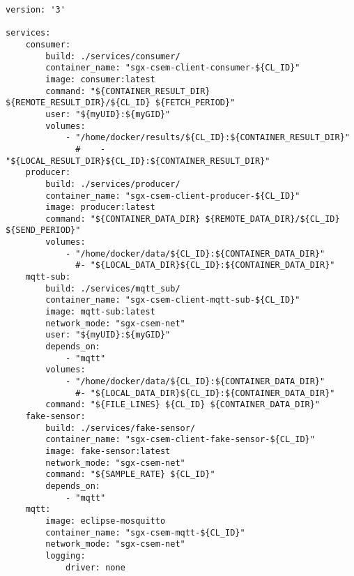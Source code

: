 \begin{lstlisting}[language=docker-compose,caption={Client Docker Compose Script.},label=code:client-compose]
version: '3'

services:
    consumer:
        build: ./services/consumer/
        container_name: "sgx-csem-client-consumer-${CL_ID}"
        image: consumer:latest
        command: "${CONTAINER_RESULT_DIR} ${REMOTE_RESULT_DIR}/${CL_ID} ${FETCH_PERIOD}"
        user: "${myUID}:${myGID}"
        volumes: 
            - "/home/docker/results/${CL_ID}:${CONTAINER_RESULT_DIR}"
              #    - "${LOCAL_RESULT_DIR}${CL_ID}:${CONTAINER_RESULT_DIR}"
    producer:
        build: ./services/producer/
        container_name: "sgx-csem-client-producer-${CL_ID}"
        image: producer:latest
        command: "${CONTAINER_DATA_DIR} ${REMOTE_DATA_DIR}/${CL_ID} ${SEND_PERIOD}"
        volumes: 
            - "/home/docker/data/${CL_ID}:${CONTAINER_DATA_DIR}"
              #- "${LOCAL_DATA_DIR}${CL_ID}:${CONTAINER_DATA_DIR}"
    mqtt-sub:
        build: ./services/mqtt_sub/
        container_name: "sgx-csem-client-mqtt-sub-${CL_ID}"
        image: mqtt-sub:latest
        network_mode: "sgx-csem-net"
        user: "${myUID}:${myGID}"
        depends_on: 
            - "mqtt"
        volumes: 
            - "/home/docker/data/${CL_ID}:${CONTAINER_DATA_DIR}"
              #- "${LOCAL_DATA_DIR}${CL_ID}:${CONTAINER_DATA_DIR}"
        command: "${FILE_LINES} ${CL_ID} ${CONTAINER_DATA_DIR}"
    fake-sensor:
        build: ./services/fake-sensor/
        container_name: "sgx-csem-client-fake-sensor-${CL_ID}"
        image: fake-sensor:latest
        network_mode: "sgx-csem-net"
        command: "${SAMPLE_RATE} ${CL_ID}"
        depends_on: 
            - "mqtt"
    mqtt:
        image: eclipse-mosquitto
        container_name: "sgx-csem-mqtt-${CL_ID}"
        network_mode: "sgx-csem-net"
        logging:
            driver: none
\end{lstlisting}

